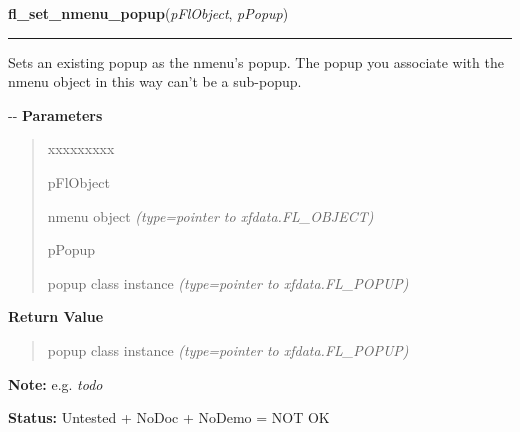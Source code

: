     \vspace{0.5ex}

\hspace{.8\funcindent}\begin{boxedminipage}{\funcwidth}

    \raggedright \textbf{fl\_set\_nmenu\_popup}(\textit{pFlObject}, \textit{pPopup})

    \vspace{-1.5ex}

    \rule{\textwidth}{0.5\fboxrule}
\setlength{\parskip}{2ex}

Sets an existing popup as the nmenu's popup. The popup you associate
with the nmenu object in this way can't be a sub-popup.

-{}-
\setlength{\parskip}{1ex}
      \textbf{Parameters}
      \vspace{-1ex}

      \begin{quote}
        \begin{Ventry}{xxxxxxxxx}

          \item[pFlObject]


nmenu object
            {\it (type=pointer to xfdata.FL\_OBJECT)}

          \item[pPopup]


popup class instance
            {\it (type=pointer to xfdata.FL\_POPUP)}

        \end{Ventry}

      \end{quote}

      \textbf{Return Value}
    \vspace{-1ex}

      \begin{quote}

popup class instance
      {\it (type=pointer to xfdata.FL\_POPUP)}

      \end{quote}

\textbf{Note:} 
e.g. \emph{todo}


\textbf{Status:} 
Untested + NoDoc + NoDemo = NOT OK


    \end{boxedminipage}

    \label{xformslib:flnmenu:fl_get_nmenu_item}

